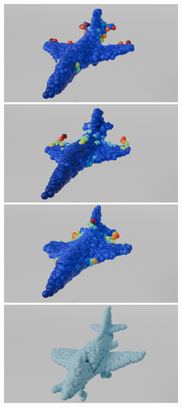 \begin{figure}[htb]
\begin{subfigure}[t]{0.315\textwidth}
            \includegraphics[width=\textwidth]{figures/do_lin_ap3.png}
            \includegraphics[width=\textwidth]{figures/ens_lin_ap3.png}
            \includegraphics[width=\textwidth]{figures/iml_lin_ap3.png}
            \includegraphics[width=\textwidth]{figures/com_ap3.png}

\end{subfigure}
\end{figure}
